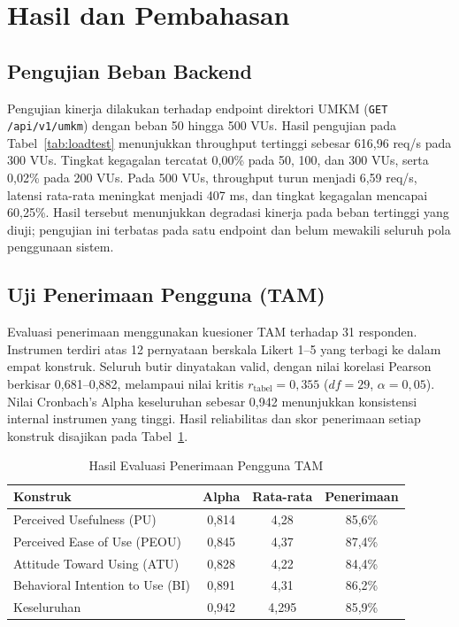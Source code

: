 \documentclass[conference]{IEEEtran}
\begin{document}
\section{Hasil dan Pembahasan}
\subsection{Pengujian Beban Backend}
Pengujian kinerja dilakukan terhadap endpoint direktori UMKM (\texttt{GET /api/v1/umkm}) dengan beban 50 hingga 500 VUs. Hasil pengujian pada Tabel~\ref{tab:loadtest} menunjukkan throughput tertinggi sebesar 616,96 req/s pada 300 VUs. Tingkat kegagalan tercatat 0,00\% pada 50, 100, dan 300 VUs, serta 0,02\% pada 200 VUs. Pada 500 VUs, throughput turun menjadi 6,59 req/s, latensi rata-rata meningkat menjadi 407 ms, dan tingkat kegagalan mencapai 60,25\%. Hasil tersebut menunjukkan degradasi kinerja pada beban tertinggi yang diuji; pengujian ini terbatas pada satu endpoint dan belum mewakili seluruh pola penggunaan sistem.

\subsection{Uji Penerimaan Pengguna (TAM)}
Evaluasi penerimaan menggunakan kuesioner TAM terhadap 31 responden. Instrumen terdiri atas 12 pernyataan berskala Likert 1--5 yang terbagi ke dalam empat konstruk. Seluruh butir dinyatakan valid, dengan nilai korelasi Pearson berkisar 0,681--0,882, melampaui nilai kritis $r_{\text{tabel}}=0,355$ ($df=29$, $\alpha=0,05$). Nilai Cronbach's Alpha keseluruhan sebesar 0,942 menunjukkan konsistensi internal instrumen yang tinggi. Hasil reliabilitas dan skor penerimaan setiap konstruk disajikan pada Tabel~\ref{tab:tam}.

\begin{table}[!b]
\caption{Hasil Evaluasi Penerimaan Pengguna TAM}
\label{tab:tam}
\centering
\footnotesize
\begin{tabular}{@{}p{}ccc@{}}
\toprule
\textbf{Konstruk} & \textbf{Alpha} & \textbf{Rata-rata} & \textbf{Penerimaan} \\
\midrule
Perceived Usefulness (PU) & 0,814 & 4,28 & 85,6\% \\
Perceived Ease of Use (PEOU) & 0,845 & 4,37 & 87,4\% \\
Attitude Toward Using (ATU) & 0,828 & 4,22 & 84,4\% \\
Behavioral Intention to Use (BI) & 0,891 & 4,31 & 86,2\% \\
Keseluruhan & 0,942 & 4,295 & 85,9\% \\
\bottomrule
\end{tabular}
\end{table}
\end{document}
